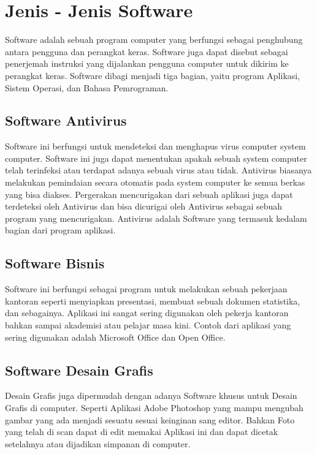 \section{Jenis - Jenis Software}
\begin{flushleft}
Software adalah sebuah program computer yang berfungsi sebagai penghubung antara pengguna dan perangkat keras. Software juga dapat disebut sebagai penerjemah instruksi yang dijalankan pengguna computer untuk dikirim ke perangkat keras. Software dibagi menjadi tiga bagian, yaitu program Aplikasi, Sistem Operasi, dan Bahasa Pemrograman. 
\end{flushleft}
\subsection{Software Antivirus}
\begin{flushleft}
Software ini berfungsi untuk mendeteksi dan menghapus virus computer system computer. Software ini juga dapat menentukan apakah sebuah system computer telah terinfeksi atau terdapat adanya sebuah virus atau tidak. Antivirus biasanya melakukan pemindaian secara otomatis pada system computer ke semua berkas yang bisa diakses. Pergerakan mencurigakan dari sebuah aplikasi juga dapat terdeteksi oleh Antivirus dan bisa dicurigai oleh Antivirus sebagai sebuah program yang mencurigakan. Antivirus adalah Software yang termasuk kedalam bagian dari program aplikasi.
\end{flushleft}
\subsection{Software Bisnis}
\begin{flushleft}
Software ini berfungsi sebagai program untuk melakukan sebuah pekerjaan kantoran seperti menyiapkan presentasi, membuat sebuah dokumen statistika, dan sebagainya. Aplikasi ini sangat sering digunakan oleh pekerja kantoran bahkan sampai akademisi atau pelajar masa kini. Contoh dari aplikasi yang sering digunakan adalah Microsoft Office dan Open Office.
\end{flushleft}
\subsection{Software Desain Grafis}
\begin{flushleft}
Desain Grafis juga dipermudah dengan adanya Software khusus untuk Desain Grafis di computer. Seperti Aplikasi Adobe Photoshop yang mampu mengubah gambar yang ada menjadi sesuatu sesuai keinginan sang editor. Bahkan Foto yang telah di scan dapat di edit memakai Aplikasi ini dan dapat dicetak setelahnya atau dijadikan simpanan di computer. 
\end{flushleft}
